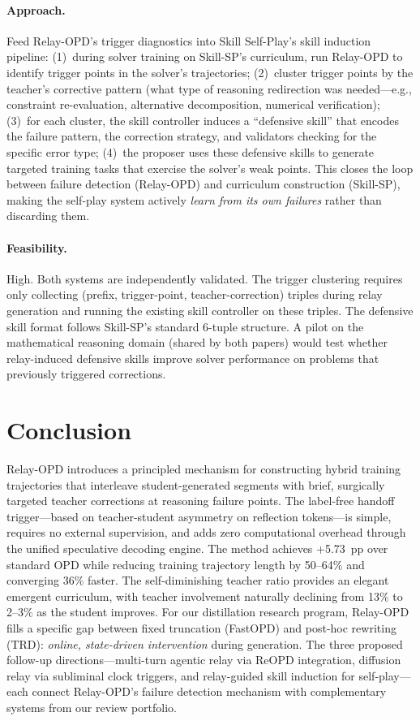 \documentclass[11pt,a4paper]{article}
\begin{document}
\paragraph{Approach.}
Feed Relay-OPD's trigger diagnostics into Skill Self-Play's skill induction pipeline: (1)~during solver training on Skill-SP's curriculum, run Relay-OPD to identify trigger points in the solver's trajectories; (2)~cluster trigger points by the teacher's corrective pattern (what type of reasoning redirection was needed---e.g., constraint re-evaluation, alternative decomposition, numerical verification); (3)~for each cluster, the skill controller induces a ``defensive skill'' that encodes the failure pattern, the correction strategy, and validators checking for the specific error type; (4)~the proposer uses these defensive skills to generate targeted training tasks that exercise the solver's weak points. This closes the loop between failure detection (Relay-OPD) and curriculum construction (Skill-SP), making the self-play system actively \emph{learn from its own failures} rather than discarding them.

\paragraph{Feasibility.}
High. Both systems are independently validated. The trigger clustering requires only collecting (prefix, trigger-point, teacher-correction) triples during relay generation and running the existing skill controller on these triples. The defensive skill format follows Skill-SP's standard 6-tuple structure. A pilot on the mathematical reasoning domain (shared by both papers) would test whether relay-induced defensive skills improve solver performance on problems that previously triggered corrections.

\section{Conclusion}

Relay-OPD introduces a principled mechanism for constructing hybrid training trajectories that interleave student-generated segments with brief, surgically targeted teacher corrections at reasoning failure points. The label-free handoff trigger---based on teacher-student asymmetry on reflection tokens---is simple, requires no external supervision, and adds zero computational overhead through the unified speculative decoding engine. The method achieves +5.73~pp over standard OPD while reducing training trajectory length by 50--64\% and converging 36\% faster. The self-diminishing teacher ratio provides an elegant emergent curriculum, with teacher involvement naturally declining from 13\% to 2--3\% as the student improves. For our distillation research program, Relay-OPD fills a specific gap between fixed truncation (FastOPD) and post-hoc rewriting (TRD): \emph{online, state-driven intervention} during generation. The three proposed follow-up directions---multi-turn agentic relay via ReOPD integration, diffusion relay via subliminal clock triggers, and relay-guided skill induction for self-play---each connect Relay-OPD's failure detection mechanism with complementary systems from our review portfolio.
\end{document}

